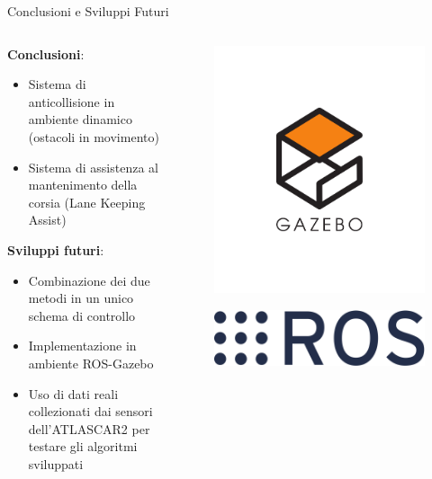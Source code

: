 \documentclass{beamer}
\begin{document}
	\begin{frame}{Conclusioni e Sviluppi Futuri}
		\begin{columns}[onlytextwidth,T]
			\begin{column}[c]{0.75\textwidth}
				\textbf{Conclusioni}:			\begin{itemize}
					\item Sistema di anticollisione in ambiente dinamico (ostacoli in movimento)
					\item Sistema di assistenza al mantenimento della corsia (Lane Keeping Assist)
				\end{itemize}
				\textbf{Sviluppi futuri}:
				\begin{itemize}
					\item Combinazione dei due metodi in un unico schema di controllo
					\item Implementazione in ambiente ROS-Gazebo
					\item Uso di dati reali collezionati dai sensori dell'ATLASCAR2 per testare gli algoritmi sviluppati
				\end{itemize}
			\end{column}
			\begin{column}[c]{0.20\textwidth}
				\begin{figure}
					\vspace{-3em}
					\includegraphics[width=
					\textwidth]{./images/GAZEBO.png}
				\end{figure}
				\begin{figure}
					\vspace{-3em}
					\includegraphics[width=
					\textwidth]{./images/ROS.png}
				\end{figure}
			\end{column}			
		\end{columns}
	\end{frame}
\end{document}
